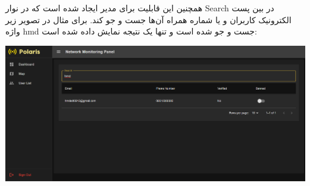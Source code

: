 \begin{itemize}
\begin{center}
    		\end{center}
   		همچنین این قابلیت برای مدیر ایجاد شده است که در نوار Search در بین پست الکترونیک کاربران و یا شماره همراه آن‌ها جست و جو کند. برای مثال در تصویر زیر واژه hmd جست و جو شده است و تنها یک نتیجه نمایش داده شده است:
   		\begin{center}
   			\includegraphics[width=\textwidth]{images/fr-userlist-search.png}
   		\end{center}
   		
    \end{itemize}